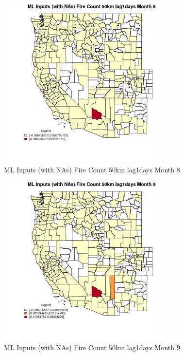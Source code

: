 \begin{figure} 
\centering  
\includegraphics[width=0.77\textwidth]{Code_Outputs/Report_ML_input_PM25_Step4_part_e_de_duplicated_aves_compiled_2019-05-21wNAs_CountyFire_Count_50km_lag1daysmedianMonth8.jpg} 
\caption{\label{fig:Report_ML_input_PM25_Step4_part_e_de_duplicated_aves_compiled_2019-05-21wNAsCountyFire_Count_50km_lag1daysmedianMonth8}ML Inputs (with NAs) Fire Count 50km lag1days Month 8} 
\end{figure} 
 

\begin{figure} 
\centering  
\includegraphics[width=0.77\textwidth]{Code_Outputs/Report_ML_input_PM25_Step4_part_e_de_duplicated_aves_compiled_2019-05-21wNAs_CountyFire_Count_50km_lag1daysmedianMonth9.jpg} 
\caption{\label{fig:Report_ML_input_PM25_Step4_part_e_de_duplicated_aves_compiled_2019-05-21wNAsCountyFire_Count_50km_lag1daysmedianMonth9}ML Inputs (with NAs) Fire Count 50km lag1days Month 9} 
\end{figure} 
 

